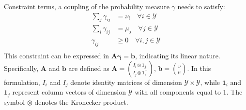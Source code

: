Constraint terms, a coupling of the probability measure $\gamma$ needs to satisfy:
\begin{equation}\label{eq:gamma_cons}
\begin{aligned}
    \sum_{j} \gamma_{ij} &= \nu_i \quad \forall i \in \mathcal{Y}\\
    \sum_{i} \gamma_{ij} &= \mu_j \quad \forall j \in \mathcal{Y}\\
    \gamma_{ij} &\geq 0  \quad \forall i,j \in \mathcal{Y}\\
\end{aligned}
\end{equation}
This constraint can be expressed in $\mathbf{A \gamma} = \mathbf{b}$, indicating its linear nature.
Specifically, $\mathbf{A}$ and $\mathbf{b}$ are defined as $\mathbf{A}=\binom{I_i \otimes \mathbf{1}_j^{\top}}{I_j \otimes \mathbf{1}_i^{\top}}$, $\mathbf{b}=\binom{\nu}{\mu}$. In this formulation, $I_i$ and $I_j$ denote identity matrices of dimension $\mathcal{Y} \times \mathcal{Y}$, while $\mathbf{1}_i$ and $\mathbf{1}_j$ represent column vectors of dimension $\mathcal{Y}$ with all components equal to 1. The symbol $\otimes$ denotes the Kronecker product.



